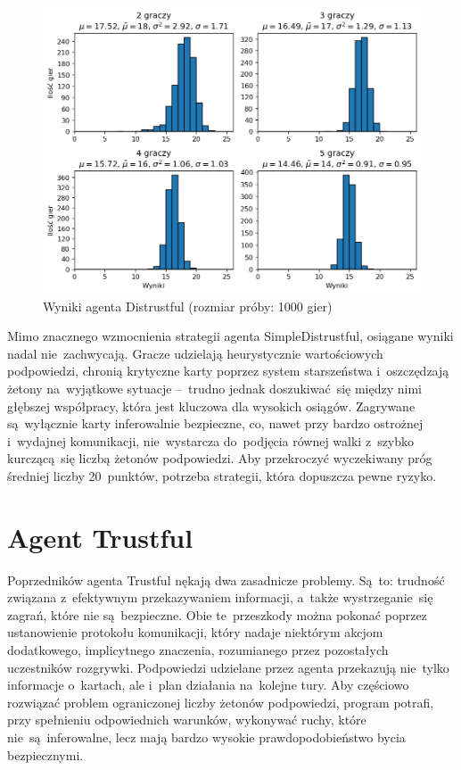\documentclass[declaration,shortabstract,inz]{iithesis}
\begin{document}
\begin{figure}[H]
	\centering
	\captionsetup{format=hang}
	\includegraphics[width=\textwidth,height=\textheight,keepaspectratio]{Distrustful.png}
	\caption[Caption]{Wyniki agenta Distrustful (rozmiar próby: 1000 gier)}
	\label{fig:Distrustful}
\end{figure}

Mimo znacznego wzmocnienia strategii agenta SimpleDistrustful, osiągane wyniki nadal nie~zachwycają. Gracze udzielają heurystycznie wartościowych podpowiedzi, chronią krytyczne karty poprzez system starszeństwa i~oszczędzają żetony na~wyjątkowe sytuacje --~trudno jednak doszukiwać~się między nimi głębszej współpracy, która jest kluczowa dla wysokich osiągów. Zagrywane są~wyłącznie karty inferowalnie bezpieczne, co, nawet przy bardzo ostrożnej i~wydajnej komunikacji, nie~wystarcza do~podjęcia równej walki z~szybko kurczącą~się liczbą żetonów podpowiedzi. Aby przekroczyć wyczekiwany próg średniej liczby 20~punktów, potrzeba strategii, która dopuszcza pewne ryzyko.

\section{Agent Trustful}

Poprzedników agenta Trustful nękają dwa zasadnicze problemy. Są~to: trudność związana z~efektywnym przekazywaniem informacji, a~także wystrzeganie~się zagrań, które nie są~bezpieczne. Obie te~przeszkody można pokonać poprzez ustanowienie protokołu komunikacji, który nadaje niektórym akcjom dodatkowego, implicytnego znaczenia, rozumianego przez pozostałych uczestników rozgrywki. Podpowiedzi udzielane przez agenta przekazują nie~tylko informacje o~kartach, ale i~plan działania na~kolejne tury. Aby częściowo rozwiązać problem ograniczonej liczby żetonów podpowiedzi, program potrafi, przy spełnieniu odpowiednich warunków, wykonywać ruchy, które nie~są~inferowalne, lecz mają bardzo wysokie prawdopodobieństwo bycia bezpiecznymi.
\end{document}
